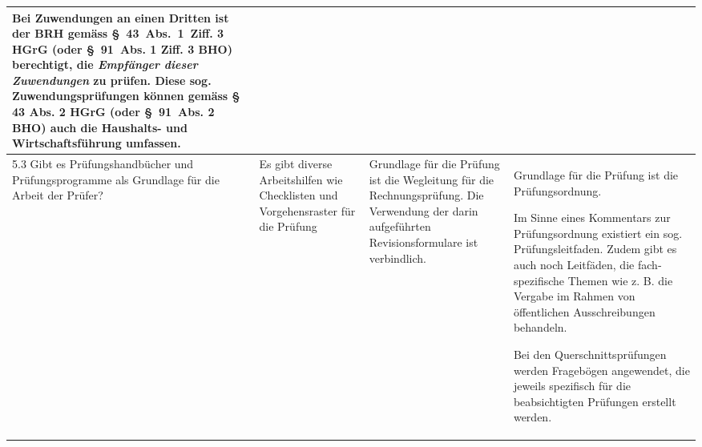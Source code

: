 \documentclass[10pt]{article}
\begin{document}
\begin{landscape}
\begin{center}
\begin{longtable}{|p{4cm}|p{5cm}|p{7.5cm}|p{7.5cm}|}
Bei Zuwendungen an einen Dritten ist der BRH gemäss §~43~Abs.~1~Ziff. 3 HGrG (oder §~91~Abs. 1 Ziff. 3 BHO)  berechtigt, die \textit{Empfänger dieser Zuwendungen} zu prüfen. Diese sog. Zuwendungsprüfungen können gemäss § 43 Abs. 2 HGrG (oder §~91~Abs. 2 BHO) auch die Haushalts- und Wirtschafts­führung umfassen.

 \\
\hline
5.3 Gibt es Prüfungshandbücher und Prüfungsprogramme als Grundlage für die Arbeit der Prüfer? & Es gibt diverse Arbeitshilfen wie Checklisten und Vorgehensraster für die Prüfung & Grundlage für die Prüfung ist die Wegleitung für die Rechnungs­prüfung. Die Verwendung der darin aufgeführten Revisionsformulare ist verbindlich. & Grundlage für die Prüfung ist die Prüfungsordnung.

Im Sinne eines Kommentars zur Prüfungsordnung existiert ein sog. Prüfungsleitfaden. Zudem gibt es auch noch Leitfäden, die fach­spezifische Themen wie z. B. die Vergabe im Rahmen von öffentlichen Ausschreibungen behandeln.

Bei den Querschnittsprüfungen werden Fragebögen angewendet, die jeweils spezifisch für die beabsichtigten Prüfungen erstellt werden.


\end{longtable}
\end{center}
\end{landscape}
\end{document}
